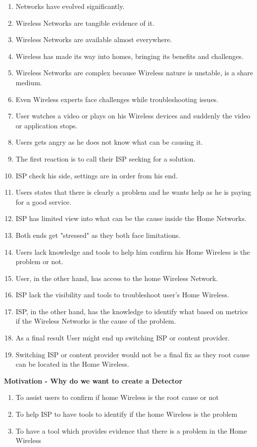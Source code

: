 \begin{enumerate}
	\item Networks have evolved significantly.
	\item Wireless Networks are tangible evidence of it.
	\item Wireless Networks are available almost everywhere.
	\item Wireless has made its way into homes, bringing its benefits and challenges.
	\item Wireless Networks are complex because Wireless nature is unstable, is a share medium.
	\item Even Wireless experts face challenges while troubleshooting issues.
	\item User watches a video or plays on his Wireless devices and suddenly the video or application stops.
	\item Users gets angry as he does not know what can be causing it.
	\item The first reaction is to call their ISP seeking for a solution.
	\item ISP check his side, settings are in order from his end.
	\item Users states that there is clearly a problem and he wants help as he is paying for a good service.
	\item ISP has limited view into what can be the cause inside the Home Networks.
	\item Both ends get "stressed" as they both face limitations.
	\item Users lack knowledge and tools to help him confirm his Home Wireless is the problem or not.
	\item User, in the other hand, has access to the home Wireless Network.
	\item ISP lack the visibility and tools to troubleshoot user's Home Wireless.
	\item ISP, in the other hand, has the knowledge to identify what based on metrics if the Wireless Networks is the cause of the problem.
	\item As a final result User might end up switching ISP or content provider.
	\item Switching ISP or content provider would not be a final fix as they root cause can be located in the Home Wireless.
\end{enumerate}

\textbf{Motivation - Why do we want to create a Detector}

\begin{enumerate}
	\item To assist users to confirm if home Wireless is the root cause or not
	\item To help ISP to have tools to identify if the home Wireless is the problem
	\item To have a tool which provides evidence that there is a problem in the Home Wireless
\end{enumerate}

